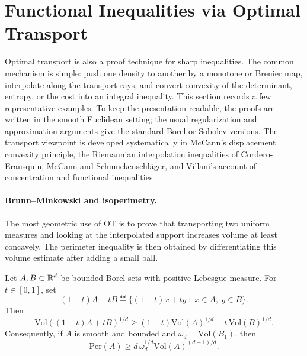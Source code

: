\section{Functional Inequalities via Optimal Transport}

Optimal transport is also a proof technique for sharp inequalities. The common mechanism is simple: push one density to another by a monotone or Brenier map, interpolate along the transport rays, and convert convexity of the determinant, entropy, or the cost into an integral inequality. This section records a few representative examples. To keep the presentation readable, the proofs are written in the smooth Euclidean setting; the usual regularization and approximation arguments give the standard Borel or Sobolev versions. The transport viewpoint is developed systematically in McCann's displacement convexity principle, the Riemannian interpolation inequalities of Cordero-Erausquin, McCann and Schmuckenschl\"ager, and Villani's account of concentration and functional inequalities~\cite{mccann1997convexity,cordero2001riemannian,Villani09}.

\paragraph{Brunn--Minkowski and isoperimetry.}
The most geometric use of OT is to prove that transporting two uniform measures and looking at the interpolated support increases volume at least concavely. The perimeter inequality is then obtained by differentiating this volume estimate after adding a small ball.

\begin{prop}\label{prop-ot-brunn-minkowski-isoperimetric}
	Let $A,B\subset\mathbb{R}^d$ be bounded Borel sets with positive Lebesgue measure. For $t\in[0,1]$, set
	\[
		(1-t)A+tB\eqdef\{(1-t)x+ty\;:\;x\in A,\ y\in B\}.
	\]
	Then
	\[
		\mathrm{Vol}((1-t)A+tB)^{1/d}
		\geq
		(1-t)\mathrm{Vol}(A)^{1/d}
		+
		t\,\mathrm{Vol}(B)^{1/d}.
	\]
	Consequently, if $A$ is smooth and bounded and $\omega_d=\mathrm{Vol}(B_1)$, then
	\[
		\mathrm{Per}(A)
		\geq
		d\,\omega_d^{1/d}\mathrm{Vol}(A)^{(d-1)/d}.
	\]
\end{prop}

